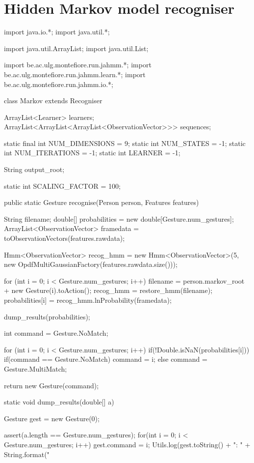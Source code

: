 \documentclass[12pt,a4,notitlepage]{report}
\renewcommand{\_}{\texttt{\symbol{95}}}
\newcommand{\<}{\texttt{\symbol{60}}}
\renewcommand{\>}{\texttt{\symbol{62}}}
\begin{document}
\chapter{Hidden Markov model recogniser}
\begin{code}
import java.io.*;
import java.util.*;

import java.util.ArrayList;
import java.util.List;

import be.ac.ulg.montefiore.run.jahmm.*;
import be.ac.ulg.montefiore.run.jahmm.learn.*;
import be.ac.ulg.montefiore.run.jahmm.io.*;

class Markov extends Recogniser
{

	ArrayList<Learner> learners;
	ArrayList<ArrayList<ArrayList<ObservationVector>>> sequences;
	
	static final int NUM_DIMENSIONS = 9;
	static int NUM_STATES = -1;
	static int NUM_ITERATIONS = -1;
	static int LEARNER = -1;
	
	String output_root;
	
	static int SCALING_FACTOR = 100;
	
	public static Gesture recognise(Person person, Features features)
	{
		String filename;
		double[] probabilities = new double[Gesture.num_gestures];
		ArrayList<ObservationVector> framedata = toObservationVectors(features.rawdata);
		
		Hmm<ObservationVector> recog_hmm = new Hmm<ObservationVector>(5, new OpdfMultiGaussianFactory(features.rawdata.size()));
				
		for (int i = 0; i < Gesture.num_gestures; i++)
		{
			filename  = person.markov_root + new Gesture(i).toAction();
			recog_hmm = restore_hmm(filename);
			probabilities[i] = recog_hmm.lnProbability(framedata);
		}

		dump_results(probabilities);

		int command = Gesture.NoMatch;
				
		for (int i = 0; i < Gesture.num_gestures; i++)
		{
			if(!Double.isNaN(probabilities[i]))
			{
				if(command == Gesture.NoMatch)
					command = i;
				else
					command = Gesture.MultiMatch;
			}
		}

		return new Gesture(command);
	}

	static void dump_results(double[] a)
	{
		Gesture gest = new Gesture(0);
		
		assert(a.length == Gesture.num_gestures);
		for(int i = 0; i < Gesture.num_gestures; i++)
		{
			gest.command = i;
			Utils.log(gest.toString() + ": " + String.format("%
		}
	}

}
\end{code}
\end{document}
